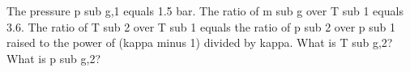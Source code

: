 The pressure p sub g,1 equals 1.5 bar. The ratio of m sub g over T sub 1 equals 3.6. The ratio of T sub 2 over T sub 1 equals the ratio of p sub 2 over p sub 1 raised to the power of (kappa minus 1) divided by kappa. What is T sub g,2? What is p sub g,2?
